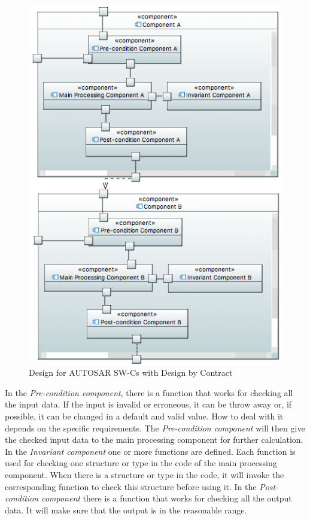 \begin{figure}[t]
\centering
\includegraphics[width=.85\columnwidth]{figure/component11.png}
\caption{Design for AUTOSAR SW-Cs with Design by Contract}
\label{fig:solution}
\end{figure}

In the {\em Pre-condition component}, there is a function that works for checking all the input data. If the input is invalid or erroneous, it can be throw away or, if possible, it can be changed in %
a default and valid value. How to deal with it depends on the specific requirements. The {\em Pre-condition component} will then give the checked input data to the main processing component for further calculation. In the {\em Invariant component} one or more functions are defined. Each function is used for checking one structure or type in the code of the main processing component. When there is a structure or type in the code, it will invoke the corresponding function to check this structure before using it. In the {\em Post-condition component} there is a function that works for checking all the output data. It will make sure that the output is in the reasonable range. 

